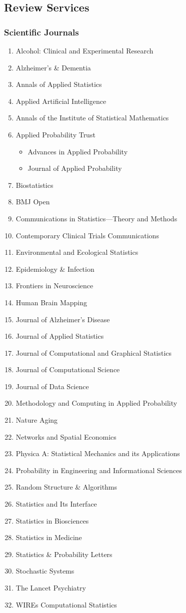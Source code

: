 \documentclass[12pt]{article}
\begin{document}
	\subsection*{Review Services}
	\subsubsection*{Scientific Journals}
	\begin{enumerate}
		\item Alcohol: Clinical and Experimental Research
		\item Alzheimer's \& Dementia
		\item Annals of Applied Statistics
		\item Applied Artificial Intelligence
		\item Annals of the Institute of Statistical Mathematics
		\item Applied Probability Trust
		\begin{itemize}
			\item Advances in Applied Probability 
			\item Journal of Applied Probability
		\end{itemize}
		\item Biostatistics
		\item BMJ Open
		\item Communications in Statistics---Theory and Methods
		\item Contemporary Clinical Trials Communications
		\item Environmental and Ecological Statistics
		\item Epidemiology \& Infection
		\item Frontiers in Neuroscience
		\item Human Brain Mapping
		\item Journal of Alzheimer's Disease
		\item Journal of Applied Statistics
		\item Journal of Computational and Graphical Statistics 
		\item Journal of Computational Science
		\item Journal of Data Science
		\item Methodology and Computing in Applied Probability
		\item Nature Aging
		\item Networks and Spatial Economics
		\item Physica A: Statistical Mechanics and its Applications
		\item Probability in Engineering and Informational Sciences
		\item Random Structure \& Algorithms
		\item Statistics and Its Interface
		\item Statistics in Biosciences
		\item Statistics in Medicine
		\item Statistics \& Probability Letters
		\item Stochastic Systems
		\item The Lancet Psychiatry 
		\item WIREs Computational Statistics
	\end{enumerate}
	
\end{document}
